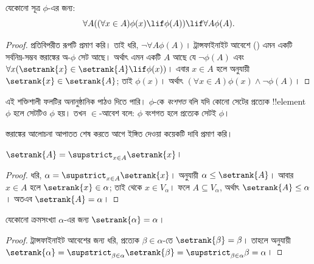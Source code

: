 \documentclass[../../../include/open-logic-section]{subfiles}
\begin{document}
\begin{thm}[$\in$-আবেশ ছক]
যেকোনো সূত্র $\phi$-এর জন্য:
\[
	\forall A((\forall x \in A)\phi(x) \lif \phi(A)) \lif \forall A \phi(A).
\]
\end{thm}

\begin{proof}
প্রতিবিপরীত রূপটি প্রমাণ করি। তাই ধরি,
$\lnot \forall A
\phi(A)$। ট্রান্সফাইনাইট আবেশে
()
এমন একটি সর্বনিম্ন-সম্ভব স্তরাঙ্কের
অ-$\phi$ সেট আছে। অর্থাৎ এমন একটি $A$
আছে যে $\lnot \phi(A)$ এবং
$\forall x(\setrank{x} \in \setrank{A}
\lif \phi(x))$। এবার $x \in A$ হলে
 অনুযায়ী
$\setrank{x} \in
\setrank{A}$; তাই $\phi(x)$। অর্থাৎ
$(\forall x \in
A)\phi(x) \land \lnot \phi(A)$।
\end{proof}\noindent
এই শক্তিশালী ফলটির অনানুষ্ঠানিক পাঠও
দিতে পারি। $\phi$-কে \emph{বংশগত} বলি যদি
কোনো সেটের প্রত্যেক !!{element} $\phi$
হলে সেটটিও $\phi$ হয়। তখন $\in$-আবেশ
বলে: $\phi$ বংশগত হলে প্রত্যেক সেটই $\phi$।

স্তরাঙ্কের আলোচনা আপাতত শেষ করতে আগে
ইঙ্গিত দেওয়া কয়েকটি দাবি প্রমাণ করি।

\begin{prop}
$\setrank{A} = \supstrict_{x \in A}\setrank{x}$।
\end{prop}

\begin{proof}
ধরি, $\alpha = \supstrict_{x \in A}\setrank{x}$।
 অনুযায়ী
$\alpha \leq \setrank{A}$। আবার
$x \in A$ হলে $\setrank{x} \in \alpha$;
তাই  থেকে
$x \in V_\alpha$। ফলে $A
\subseteq V_\alpha$, অর্থাৎ
$\setrank{A} \leq \alpha$। অতএব
$\setrank{A} = \alpha$।
\end{proof}

\begin{cor}
যেকোনো ক্রমসংখ্যা $\alpha$-এর জন্য
$\setrank{\alpha} = \alpha$।
\end{cor}

\begin{proof}
ট্রান্সফাইনাইট আবেশের জন্য ধরি,
প্রত্যেক $\beta \in \alpha$-তে
$\setrank{\beta} = \beta$। তাহলে
 অনুযায়ী
$\setrank{\alpha} = \supstrict_{\beta \in
\alpha}\setrank{\beta} = \supstrict_{\beta \in \alpha}\beta = \alpha$।
%
\end{proof}
\end{document}
